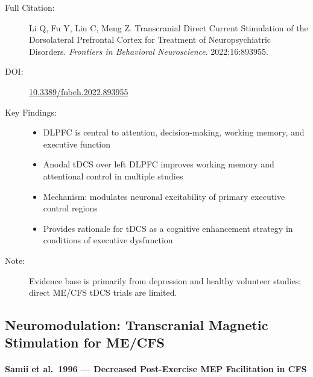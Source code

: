 \begin{description}
    \item[Full Citation:] Li Q, Fu Y, Liu C, Meng Z\@. Transcranial Direct Current Stimulation of the Dorsolateral Prefrontal Cortex for Treatment of Neuropsychiatric Disorders. \textit{Frontiers in Behavioral Neuroscience}. 2022;16:893955.
    \item[DOI:] \href{https://doi.org/10.3389/fnbeh.2022.893955}{10.3389/fnbeh.2022.893955}
    \item[Key Findings:]
    \begin{itemize}
        \item DLPFC is central to attention, decision-making, working memory, and executive function
        \item Anodal tDCS over left DLPFC improves working memory and attentional control in multiple studies
        \item Mechanism: modulates neuronal excitability of primary executive control regions
        \item Provides rationale for tDCS as a cognitive enhancement strategy in conditions of executive dysfunction
    \end{itemize}
    \item[Note:] Evidence base is primarily from depression and healthy volunteer studies; direct ME/CFS tDCS trials are limited.
\end{description}

\subsection{Neuromodulation: Transcranial Magnetic Stimulation for ME/CFS}

\paragraph{Samii et al.\ 1996 --- Decreased Post-Exercise MEP Facilitation in CFS}

